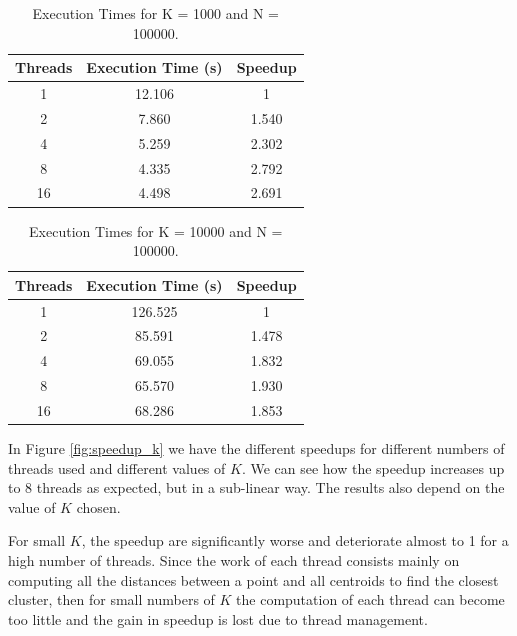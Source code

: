\documentclass[10pt,twocolumn,letterpaper]{article}
\begin{document}
\begin{table}[H]
	\begin{center}
		\begin{tabular}{|c|c|c|}
			\hline
			Threads & Execution Time (s) & Speedup \\
			\hline
			1 & 12.106 & 1 \\ 
			2 & 7.860 & 1.540 \\
			4 & 5.259 & 2.302 \\
			8 & 4.335 & 2.792 \\ 
			16 & 4.498 & 2.691 \\
			\hline
		\end{tabular}
	\end{center}
	\caption{Execution Times for K = 1000 and N = 100000.}
	\label{tab:speedup_k_n_3}
\end{table}

\begin{table}[H]
	\begin{center}
		\begin{tabular}{|c|c|c|}
			\hline
			Threads & Execution Time (s) & Speedup \\
			\hline
			1 & 126.525 & 1 \\ 
			2 & 85.591 & 1.478 \\
			4 & 69.055 & 1.832 \\
			8 & 65.570 & 1.930 \\ 
			16 & 68.286 & 1.853 \\
			\hline
		\end{tabular}
	\end{center}
	\caption{Execution Times for K = 10000 and N = 100000.}
	\label{tab:speedup_k_n_4}
\end{table}

In Figure \ref{fig:speedup_k} we have the different speedups for different numbers of threads used and different values of $K$. We can see how the speedup increases up to 8 threads as expected, but in a sub-linear way.
The results also depend on the value of $K$ chosen. 

For small $K$, the speedup are significantly worse and deteriorate almost to 1 for a high number of threads. Since the work of each thread consists mainly on computing all the distances between a point and all centroids to find the closest cluster, then for small numbers of $K$ the computation of each thread can become too little and the gain in speedup is lost due to thread management.
\end{document}
